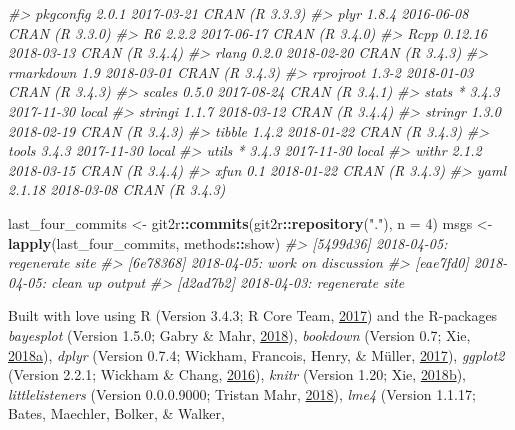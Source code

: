 \documentclass [11pt, proquest] {uwthesis}[2015/03/03]
\newenvironment{Shaded}{}{}
\newcommand{\KeywordTok}[1]{\textcolor[rgb]{0.00,0.44,0.13}{\textbf{{#1}}}}
\newcommand{\DataTypeTok}[1]{\textcolor[rgb]{0.56,0.13,0.00}{{#1}}}
\newcommand{\DecValTok}[1]{\textcolor[rgb]{0.25,0.63,0.44}{{#1}}}
\newcommand{\StringTok}[1]{\textcolor[rgb]{0.25,0.44,0.63}{{#1}}}
\newcommand{\CommentTok}[1]{\textcolor[rgb]{0.38,0.63,0.69}{\textit{{#1}}}}
\newcommand{\NormalTok}[1]{{#1}}
\newcommand{\OperatorTok}[1]{\textcolor[rgb]{0.00,0.44,0.13}{\textbf{{#1}}}}
\begin{document}
\begin{Shaded}
\begin{Highlighting}[]
\CommentTok{#>  pkgconfig    2.0.1   2017-03-21 CRAN (R 3.3.3)}
\CommentTok{#>  plyr         1.8.4   2016-06-08 CRAN (R 3.3.0)}
\CommentTok{#>  R6           2.2.2   2017-06-17 CRAN (R 3.4.0)}
\CommentTok{#>  Rcpp         0.12.16 2018-03-13 CRAN (R 3.4.4)}
\CommentTok{#>  rlang        0.2.0   2018-02-20 CRAN (R 3.4.3)}
\CommentTok{#>  rmarkdown    1.9     2018-03-01 CRAN (R 3.4.3)}
\CommentTok{#>  rprojroot    1.3-2   2018-01-03 CRAN (R 3.4.3)}
\CommentTok{#>  scales       0.5.0   2017-08-24 CRAN (R 3.4.1)}
\CommentTok{#>  stats      * 3.4.3   2017-11-30 local         }
\CommentTok{#>  stringi      1.1.7   2018-03-12 CRAN (R 3.4.4)}
\CommentTok{#>  stringr      1.3.0   2018-02-19 CRAN (R 3.4.3)}
\CommentTok{#>  tibble       1.4.2   2018-01-22 CRAN (R 3.4.3)}
\CommentTok{#>  tools        3.4.3   2017-11-30 local         }
\CommentTok{#>  utils      * 3.4.3   2017-11-30 local         }
\CommentTok{#>  withr        2.1.2   2018-03-15 CRAN (R 3.4.4)}
\CommentTok{#>  xfun         0.1     2018-01-22 CRAN (R 3.4.3)}
\CommentTok{#>  yaml         2.1.18  2018-03-08 CRAN (R 3.4.3)}

\NormalTok{last_four_commits <-}\StringTok{ }\NormalTok{git2r}\OperatorTok{::}\KeywordTok{commits}\NormalTok{(git2r}\OperatorTok{::}\KeywordTok{repository}\NormalTok{(}\StringTok{"."}\NormalTok{), }\DataTypeTok{n =} \DecValTok{4}\NormalTok{)}
\NormalTok{msgs <-}\StringTok{ }\KeywordTok{lapply}\NormalTok{(last_four_commits, methods}\OperatorTok{::}\NormalTok{show)}
\CommentTok{#> [5499d36] 2018-04-05: regenerate site}
\CommentTok{#> [6e78368] 2018-04-05: work on discussion}
\CommentTok{#> [eae7fd0] 2018-04-05: clean up output}
\CommentTok{#> [d2ad7b2] 2018-04-03: regenerate site}
\end{Highlighting}
\end{Shaded}
Built with love using R (Version 3.4.3; R Core Team,
\protect\hyperlink{ref-R-base}{2017}) and the R-packages
\emph{bayesplot} (Version 1.5.0; Gabry \& Mahr,
\protect\hyperlink{ref-R-bayesplot}{2018}), \emph{bookdown} (Version
0.7; Xie,
\protect\hyperlink{ref-R-bookdown}{2018}\protect\hyperlink{ref-R-bookdown}{a}),
\emph{dplyr} (Version 0.7.4; Wickham, Francois, Henry, \& Müller,
\protect\hyperlink{ref-R-dplyr}{2017}), \emph{ggplot2} (Version 2.2.1;
Wickham \& Chang, \protect\hyperlink{ref-R-ggplot2}{2016}), \emph{knitr}
(Version 1.20; Xie,
\protect\hyperlink{ref-R-knitr}{2018}\protect\hyperlink{ref-R-knitr}{b}),
\emph{littlelisteners} (Version 0.0.0.9000; Tristan Mahr,
\protect\hyperlink{ref-R-littlelisteners}{2018}), \emph{lme4} (Version
1.1.17; Bates, Maechler, Bolker, \& Walker,
\end{document}
